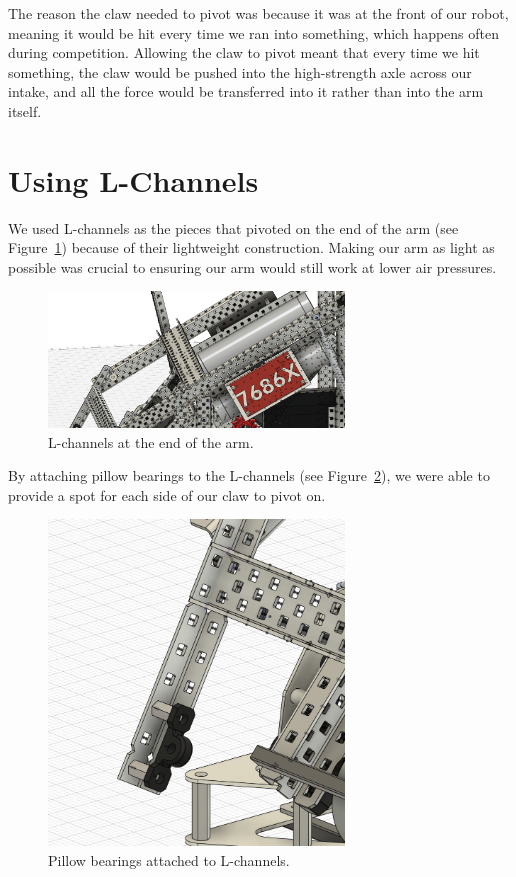 The reason the claw needed to pivot was because it was at the front of our robot, meaning it would be hit every time we ran into something, which happens often during competition. Allowing the claw to pivot meant that every time we hit something, the claw would be pushed into the high-strength axle across our intake, and all the force would be transferred into it rather than into the arm itself.

\section*{Using L-Channels}
We used L-channels as the pieces that pivoted on the end of the arm (see Figure~\ref{fig:ichannelsendofarm}) because of their lightweight construction. Making our arm as light as possible was crucial to ensuring our arm would still work at lower air pressures. 

\begin{figure}[H]
    \centering
    \includegraphics[width=0.7\textwidth]{images/Ichannelsendofarm.png}
    \caption{L-channels at the end of the arm.}
    \label{fig:ichannelsendofarm}
\end{figure}

By attaching pillow bearings to the L-channels (see Figure~\ref{fig:pillowbearings}), we were able to provide a spot for each side of our claw to pivot on. 

\begin{figure}[H]
    \centering
    \includegraphics[width=0.7\textwidth]{images/Pillowbearings.png}
    \caption{Pillow bearings attached to L-channels.}
    \label{fig:pillowbearings}
\end{figure}

